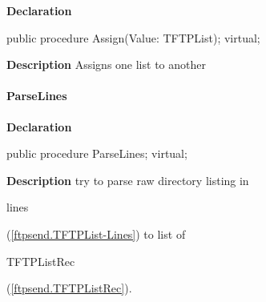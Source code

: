 \documentclass{report}
\newif\ifpdf
\begin{document}
\label{ftpsend.TFTPList-Assign}
\begin{list}{}{
\setlength{\itemindent}{0cm}
\setlength{\listparindent}{0cm}
\setlength{\leftmargin}{\evensidemargin}
\addtolength{\leftmargin}{\tmplength}
\settowidth{\labelsep}{X}
\addtolength{\leftmargin}{\labelsep}
\setlength{\labelwidth}{\tmplength}
}
\item[\textbf{Declaration}\hfill]
\ifpdf
\begin{flushleft}
\fi
\begin{ttfamily}
public procedure Assign(Value: TFTPList); virtual;\end{ttfamily}

\ifpdf
\end{flushleft}
\fi

\par
\item[\textbf{Description}]
Assigns one list to another

\end{list}
\paragraph*{ParseLines}\hspace*{\fill}

\label{ftpsend.TFTPList-ParseLines}
\begin{list}{}{
\setlength{\itemindent}{0cm}
\setlength{\listparindent}{0cm}
\setlength{\leftmargin}{\evensidemargin}
\addtolength{\leftmargin}{\tmplength}
\settowidth{\labelsep}{X}
\addtolength{\leftmargin}{\labelsep}
\setlength{\labelwidth}{\tmplength}
}
\item[\textbf{Declaration}\hfill]
\ifpdf
\begin{flushleft}
\fi
\begin{ttfamily}
public procedure ParseLines; virtual;\end{ttfamily}

\ifpdf
\end{flushleft}
\fi

\par
\item[\textbf{Description}]
try to parse raw directory listing in \begin{ttfamily}lines\end{ttfamily}(\ref{ftpsend.TFTPList-Lines}) to list of \begin{ttfamily}TFTPListRec\end{ttfamily}(\ref{ftpsend.TFTPListRec}).

\end{list}
\ifpdf
\end{document}
